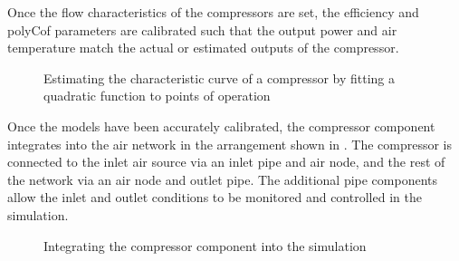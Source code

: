 		 Once the flow characteristics of the compressors are set, the efficiency and \gls{polyCof} parameters are calibrated such that the output power and air temperature match the actual or estimated outputs of the compressor.
		\par 
		\begin{figure}[h!]
			\centering
			\fbox{}
			\caption{Estimating the characteristic curve of a compressor by fitting a quadratic function to points of operation}
			\label{fig: Compressor Curve}
		\end{figure}
		Once the models have been accurately calibrated, the compressor component integrates into the air network in the arrangement shown in . The compressor is connected to the inlet air source via an inlet pipe and air node, and the rest of the network via an air node and outlet pipe. The additional pipe components allow the inlet and outlet conditions to be monitored and controlled in the simulation.
		\begin{figure}[h]
			\centering
			\caption{Integrating the compressor component into the simulation}
			\label{fig: Compressor models}
		\end{figure}		

